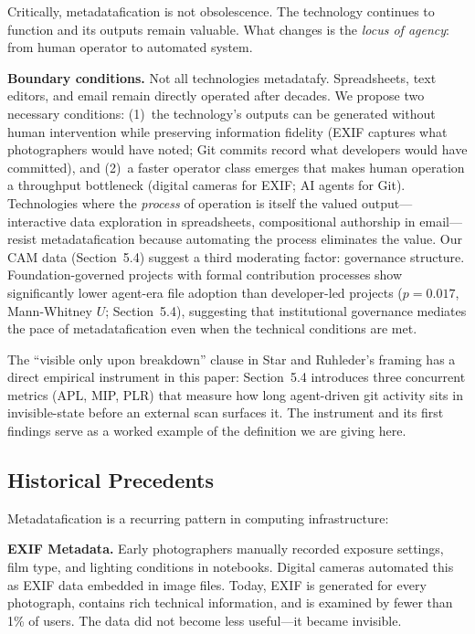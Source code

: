\documentclass[sigconf, nonacm, anonymous=false]{acmart}
\begin{document}
Critically, metadatafication is not obsolescence. The technology continues to function and its outputs remain valuable. What changes is the \textit{locus of agency}: from human operator to automated system.

\textbf{Boundary conditions.} Not all technologies metadatafy. Spreadsheets, text editors, and email remain directly operated after decades. We propose two necessary conditions: (1)~the technology's outputs can be generated without human intervention while preserving information fidelity (EXIF captures what photographers would have noted; Git commits record what developers would have committed), and (2)~a faster operator class emerges that makes human operation a throughput bottleneck (digital cameras for EXIF; AI agents for Git). Technologies where the \textit{process} of operation is itself the valued output---interactive data exploration in spreadsheets, compositional authorship in email---resist metadatafication because automating the process eliminates the value. Our CAM data (Section~5.4) suggest a third moderating factor: governance structure. Foundation-governed projects with formal contribution processes show significantly lower agent-era file adoption than developer-led projects ($p=0.017$, Mann-Whitney $U$; Section~5.4), suggesting that institutional governance mediates the pace of metadatafication even when the technical conditions are met.

The ``visible only upon breakdown'' clause in Star and Ruhleder's framing has a direct empirical instrument in this paper: Section~5.4 introduces three concurrent metrics (APL, MIP, PLR) that measure how long agent-driven git activity sits in invisible-state before an external scan surfaces it. The instrument and its first findings serve as a worked example of the definition we are giving here.

\subsection{Historical Precedents}

Metadatafication is a recurring pattern in computing infrastructure:

\textbf{EXIF Metadata.} Early photographers manually recorded exposure settings, film type, and lighting conditions in notebooks. Digital cameras automated this as EXIF data embedded in image files. Today, EXIF is generated for every photograph, contains rich technical information, and is examined by fewer than 1\% of users. The data did not become less useful---it became invisible.
\end{document}
